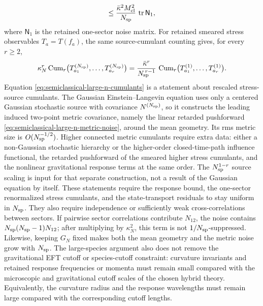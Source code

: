 \begin{controlledapproximation}
\begin{equation}
  \le
  \frac{\bar\kappa^2M_{\rm cl}^2}{N_{\rm sp}}\,
  \operatorname{tr}\mathsf N_1 ,
  \label{eq:semiclassical-large-n-metric-noise}
\end{equation}
where \(\mathsf N_1\) is the retained one-sector noise matrix.  For retained
smeared stress observables \(T_a=T(f_a)\), the same source-cumulant counting
gives, for every \(r\ge2\),
\begin{equation}
  \kappa_N^r
  \operatorname{Cum}_r
  \bigl(T_{a_1}^{(N_{\rm sp})},\ldots,T_{a_r}^{(N_{\rm sp})}\bigr)
  =
  \frac{\bar\kappa^r}{N_{\rm sp}^{\,r-1}}\,
  \operatorname{Cum}_r
  \bigl(T_{a_1}^{(1)},\ldots,T_{a_r}^{(1)}\bigr) .
  \label{eq:semiclassical-large-n-cumulants}
\end{equation}
Equation \eqref{eq:semiclassical-large-n-cumulants} is a statement about
rescaled stress-source cumulants.  The Gaussian Einstein--Langevin equation
uses only a centered Gaussian stochastic source with covariance
\(N^{(N_{\rm sp})}\), so it constructs the leading induced two-point metric
covariance, namely the linear retarded pushforward
\eqref{eq:semiclassical-large-n-metric-noise}, around the mean geometry.  Its
rms metric size is \(O(N_{\rm sp}^{-1/2})\).  Higher connected metric cumulants
require extra data: either a non-Gaussian stochastic hierarchy or the
higher-order closed-time-path influence functional, the retarded pushforward of
the smeared higher stress cumulants, and the nonlinear gravitational response
terms at the same order.  The \(N_{\rm sp}^{1-r}\) source scaling is input for
that separate construction, not a result of the Gaussian equation by itself.
These statements require the response bound, the one-sector renormalized stress
cumulants, and the state-transport residuals to stay uniform in \(N_{\rm sp}\).
They also require independence or sufficiently weak cross-correlations between
sectors.  If pairwise sector correlations contribute \(N_{12}\), the noise
contains \(N_{\rm sp}(N_{\rm sp}-1)N_{12}\); after multiplying by
\(\kappa_N^2\), this term is not \(1/N_{\rm sp}\)-suppressed.  Likewise,
keeping \(G_N\) fixed makes both the mean geometry and the metric noise grow
with \(N_{\rm sp}\).  The
large-species argument also does not remove the gravitational EFT cutoff or
species-cutoff constraint: curvature invariants and retained response
frequencies or momenta must remain small compared with the microscopic and
gravitational cutoff scales of the chosen hybrid theory.  Equivalently, the
curvature radius and the response wavelengths must remain large compared with
the corresponding cutoff lengths.
\end{controlledapproximation}

